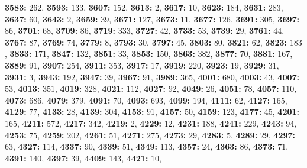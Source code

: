 \textsf{\bfseries 3583:} $262$, \textsf{\bfseries 3593:} $133$, \textsf{\bfseries 3607:} $152$, \textsf{\bfseries 3613:} $2$, \textsf{\bfseries 3617:} $10$, \textsf{\bfseries 3623:} $184$, \textsf{\bfseries 3631:} $283$, \textsf{\bfseries 3637:} $60$, \textsf{\bfseries 3643:} $2$, \textsf{\bfseries 3659:} $39$, \textsf{\bfseries 3671:} $127$, \textsf{\bfseries 3673:} $11$, \textsf{\bfseries 3677:} $126$, \textsf{\bfseries 3691:} $305$, \textsf{\bfseries 3697:} $86$, \textsf{\bfseries 3701:} $68$, \textsf{\bfseries 3709:} $86$, \textsf{\bfseries 3719:} $333$, \textsf{\bfseries 3727:} $42$, \textsf{\bfseries 3733:} $53$, \textsf{\bfseries 3739:} $29$, \textsf{\bfseries 3761:} $44$, \textsf{\bfseries 3767:} $87$, \textsf{\bfseries 3769:} $74$, \textsf{\bfseries 3779:} $8$, \textsf{\bfseries 3793:} $30$, \textsf{\bfseries 3797:} $45$, \textsf{\bfseries 3803:} $80$, \textsf{\bfseries 3821:} $62$, \textsf{\bfseries 3823:} $183$, \textsf{\bfseries 3833:} $171$, \textsf{\bfseries 3847:} $132$, \textsf{\bfseries 3851:} $33$, \textsf{\bfseries 3853:} $150$, \textsf{\bfseries 3863:} $382$, \textsf{\bfseries 3877:} $70$, \textsf{\bfseries 3881:} $167$, \textsf{\bfseries 3889:} $91$, \textsf{\bfseries 3907:} $254$, \textsf{\bfseries 3911:} $353$, \textsf{\bfseries 3917:} $17$, \textsf{\bfseries 3919:} $220$, \textsf{\bfseries 3923:} $19$, \textsf{\bfseries 3929:} $31$, \textsf{\bfseries 3931:} $3$, \textsf{\bfseries 3943:} $192$, \textsf{\bfseries 3947:} $39$, \textsf{\bfseries 3967:} $91$, \textsf{\bfseries 3989:} $365$, \textsf{\bfseries 4001:} $680$, \textsf{\bfseries 4003:} $43$, \textsf{\bfseries 4007:} $53$, \textsf{\bfseries 4013:} $351$, \textsf{\bfseries 4019:} $328$, \textsf{\bfseries 4021:} $112$, \textsf{\bfseries 4027:} $92$, \textsf{\bfseries 4049:} $26$, \textsf{\bfseries 4051:} $78$, \textsf{\bfseries 4057:} $110$, \textsf{\bfseries 4073:} $686$, \textsf{\bfseries 4079:} $379$, \textsf{\bfseries 4091:} $70$, \textsf{\bfseries 4093:} $693$, \textsf{\bfseries 4099:} $194$, \textsf{\bfseries 4111:} $62$, \textsf{\bfseries 4127:} $165$, \textsf{\bfseries 4129:} $77$, \textsf{\bfseries 4133:} $28$, \textsf{\bfseries 4139:} $304$, \textsf{\bfseries 4153:} $91$, \textsf{\bfseries 4157:} $50$, \textsf{\bfseries 4159:} $123$, \textsf{\bfseries 4177:} $45$, \textsf{\bfseries 4201:} $165$, \textsf{\bfseries 4211:} $572$, \textsf{\bfseries 4217:} $342$, \textsf{\bfseries 4219:} $2$, \textsf{\bfseries 4229:} $12$, \textsf{\bfseries 4231:} $188$, \textsf{\bfseries 4241:} $229$, \textsf{\bfseries 4243:} $94$, \textsf{\bfseries 4253:} $75$, \textsf{\bfseries 4259:} $202$, \textsf{\bfseries 4261:} $51$, \textsf{\bfseries 4271:} $275$, \textsf{\bfseries 4273:} $29$, \textsf{\bfseries 4283:} $5$, \textsf{\bfseries 4289:} $29$, \textsf{\bfseries 4297:} $63$, \textsf{\bfseries 4327:} $114$, \textsf{\bfseries 4337:} $90$, \textsf{\bfseries 4339:} $51$, \textsf{\bfseries 4349:} $113$, \textsf{\bfseries 4357:} $24$, \textsf{\bfseries 4363:} $86$, \textsf{\bfseries 4373:} $71$, \textsf{\bfseries 4391:} $140$, \textsf{\bfseries 4397:} $39$, \textsf{\bfseries 4409:} $143$, \textsf{\bfseries 4421:} $10$, 
